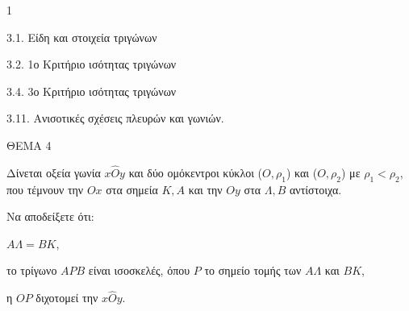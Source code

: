\begin{ylh}{1}
    \item 3.1. Είδη και στοιχεία τριγώνων
    \item 3.2. 1ο Κριτήριο ισότητας τριγώνων
    \item 3.4. 3ο Κριτήριο ισότητας τριγώνων
    \item 3.11. Ανισοτικές σχέσεις πλευρών και γωνιών.
\end{ylh}

ΘΕΜΑ 4

Δίνεται οξεία γωνία $x\widehat{O}y$ και δύο ομόκεντροι κύκλοι ($O, \rho_1$) και ($O, \rho_2$) με $\rho_1 < \rho_2$, που τέμνουν την $Ox$ στα σημεία $K, A$ και την $Oy$ στα $\Lambda, B$ αντίστοιχα.

Να αποδείξετε ότι:

\begin{alist}
\item $A\Lambda = BK$, 
\item το τρίγωνο $APB$ είναι ισοσκελές, όπου $P$ το σημείο τομής των $A\Lambda$ και $BK$, 
\item η $OP$ διχοτομεί την $x\widehat{O}y$. 

\begin{center}
\end{center}
\end{alist}

